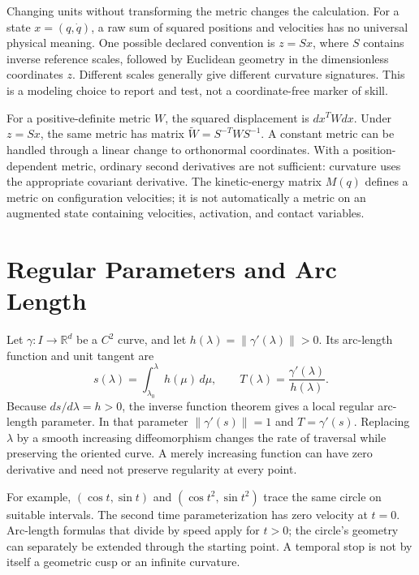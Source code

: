 Changing units without transforming the metric changes the calculation.
For a state $x=(q,\dot q)$, a raw sum of squared positions and velocities has
no universal physical meaning. One possible declared convention is
$z=Sx$, where $S$ contains inverse reference scales, followed by Euclidean
geometry in the dimensionless coordinates $z$. Different scales generally
give different curvature signatures. This is a modeling choice to report
and test, not a coordinate-free marker of skill.

For a positive-definite metric $W$, the squared displacement is
$dx^T W dx$. Under $z=Sx$, the same metric has matrix
$\widetilde W=S^{-T}WS^{-1}$. A constant metric can be handled through a
linear change to orthonormal coordinates. With a position-dependent metric,
ordinary second derivatives are not sufficient: curvature uses the
appropriate covariant derivative. The kinetic-energy matrix $M(q)$ defines
a metric on configuration velocities; it is not automatically a metric on
an augmented state containing velocities, activation, and contact variables.

\section{Regular Parameters and Arc Length}

Let $\gamma:I\rightarrow\mathbb R^d$ be a $C^2$ curve, and let
$h(\lambda)=\|\gamma'(\lambda)\|>0$. Its arc-length function and unit tangent are
\begin{equation}\label{eq:arc_length}
 s(\lambda)=\int_{\lambda_0}^{\lambda}h(\mu)\,d\mu,
 \qquad T(\lambda)=\frac{\gamma'(\lambda)}{h(\lambda)}.
\end{equation}
Because $ds/d\lambda=h>0$, the inverse function theorem gives a local regular
arc-length parameter. In that parameter $\|\gamma'(s)\|=1$ and
$T=\gamma'(s)$. Replacing $\lambda$ by a smooth increasing diffeomorphism
changes the rate of traversal while preserving the oriented curve.
A merely increasing function can have zero derivative and need not preserve
regularity at every point.

For example, $(\cos t,\sin t)$ and $(\cos t^2,\sin t^2)$ trace the same circle
on suitable intervals. The second time parameterization has zero velocity
at $t=0$. Arc-length formulas that divide by speed apply for $t>0$; the
circle's geometry can separately be extended through the starting point.
A temporal stop is not by itself a geometric cusp or an infinite curvature.

